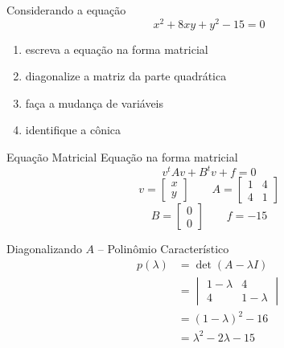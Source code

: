 
\begin{question}
  Considerando a equação
  \[
    x^2 + 8xy + y^2 - 15 = 0
  \]
  \vspace{-\baselineskip}
  \begin{enumerate}
    \item escreva a equação na forma matricial
    \item diagonalize a matriz da parte quadrática
    \item faça a mudança de variáveis
    \item identifique a cônica
  \end{enumerate}
\end{question}

\begin{resolution}{Equação Matricial}
  Equação na forma matricial
  \[
    v^tAv+B^tv+f=0
  \]
  \[
    v=\begin{bmatrix}x\\y\end{bmatrix}
    \qquad
    A=\begin{bmatrix}
      1&4\\
      4&1
    \end{bmatrix}
  \]
  \[
    B=\begin{bmatrix}0\\0\end{bmatrix}
    \qquad
    f=-15
  \]
\end{resolution}

\begin{resolution}{Diagonalizando $A$ -- Polinômio Característico}
  \begin{align*}
    p(\lambda)
    & = \det(A-\lambda I)
    \\
    & = \begin{vmatrix}
      1-\lambda&4\\
      4&1-\lambda
    \end{vmatrix}
    \\
    & = (1-\lambda)^2-16
    \\
    & = \lambda^2-2\lambda-15
  \end{align*}
\end{resolution}


